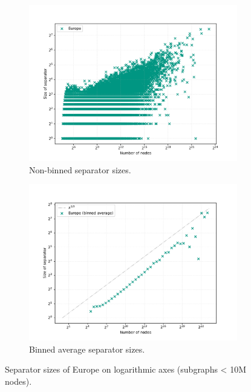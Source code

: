 \begin{figure}
    \begin{subfigure}{0.49\linewidth}
        \centering
        \includegraphics[width=\linewidth]{graphics/Europe_non_binned.png}
        \caption{Non-binned separator sizes.}
    \end{subfigure}
    \hfill
	\begin{subfigure}{0.49\linewidth}
		\centering
		\includegraphics[width=\linewidth]{graphics/Europe-binned.pdf}
		\caption{Binned average separator sizes.}
        \label{fig:separator_size_loglog_binned}
	\end{subfigure}
    \caption{Separator sizes of Europe on logarithmic axes (subgraphs < 10M nodes).}
    \label{fig:separator_size_loglog}
\end{figure}

